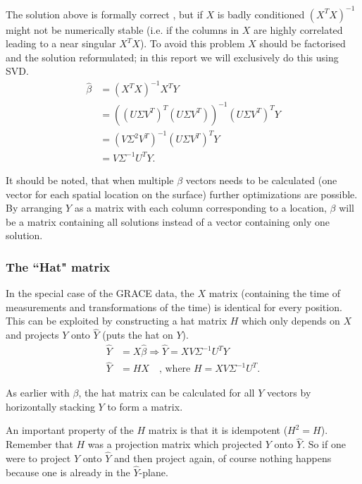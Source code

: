 The solution above is formally correct \cite[s.~12]{statistical-learning}, but if $X$ is badly conditioned $(X^T X)^{-1}$ might not be numerically stable (i.e. if the columns in $X$ are highly correlated leading to a near singular $X^T X$). 
To avoid this problem $X$ should be factorised and the solution reformulated; in this report we will exclusively do this using SVD.
\begin{equation}
\begin{split}
\hat{\beta} &= (X^T X)^{-1} X^T Y \\
&= \left( \left(U \Sigma V^T\right)^T \left(U \Sigma V^T\right) \right)^{-1} \left(U \Sigma V^T \right)^T Y \\
&= \left( V \Sigma^2 V^T \right)^{-1} \left(U \Sigma V^T \right)^T Y \\
&= V \Sigma^{-1} U^T Y.
\end{split}
\end{equation}

It should be noted, that when multiple $\beta$ vectors needs to be calculated (one vector for each spatial location on the surface) further optimizations are possible.
By arranging $Y$ as a matrix with each column corresponding to a location, $\beta$ will be a matrix containing all solutions instead of a vector containing only one solution.

\subsubsection{The ``Hat" matrix}
In the special case of the GRACE data, the $X$ matrix (containing the time of measurements and transformations of the time) is identical for every position. This can be exploited by constructing a hat matrix $H$ which only depends on $X$ and projects $Y$ onto $\hat{Y}$ (puts the hat on $Y$).
\begin{equation}
\begin{split}
\hat{Y} &= X \hat{\beta} \Rightarrow \hat{Y} = X V \Sigma^{-1} U^T Y \\
\hat{Y} &= H X \quad \text{, where } H = X V \Sigma^{-1} U^T.
\end{split}
\end{equation}

As earlier with $\beta$, the hat matrix can be calculated for all $Y$ vectors by horizontally stacking $Y$ to form a matrix.

An important property of the $H$ matrix is that it is idempotent ($H^2 = H$).
Remember that $H$ was a projection matrix which projected $Y$ onto $\hat{Y}$.
So if one were to project $Y$ onto $\hat{Y}$ and then project again, of course nothing happens because one is already in the $\hat{Y}$-plane.

